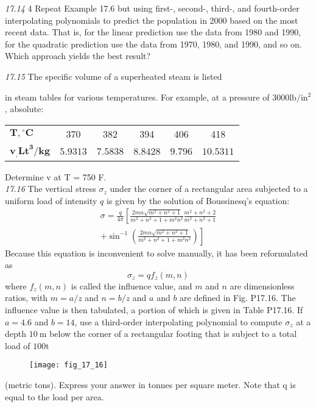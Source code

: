 \documentclass[../main.tex]{subfiles}
\begin{document}
\begin{multicols}{2}
\noindent\textit{17.14} 4 Repeat Example 17.6 but using first-, second-, third-,
and fourth-order interpolating polynomials to predict the
population in 2000 based on the most recent data. That is, for
the linear prediction use the data from 1980 and 1990, for the
quadratic prediction use the data from 1970, 1980, and 1990,
and so on. Which approach yields the best result?

\noindent\textit{17.15} The specific volume of a superheated steam is listed

in steam tables for various temperatures. For example, at a pressure of $3000 \mathrm{lb} / \mathrm{in}^{2}$, absolute:
\begin{tabular}{lccccc}
\hline $\boldsymbol{T},{ }^{\circ} \mathbf{C}$ & 370 & 382 & 394 & 406 & 418 \\
$\boldsymbol{v}_{\boldsymbol{,}} \mathbf{L t}^{\mathbf{3}} / \mathbf{k g}$ & $5.9313$ & $7.5838$ & $8.8428$ & $9.796$ & $10.5311$ \\
\hline
\end{tabular}
Determine v at T = 750 F.\\
\noindent\textit{17.16} The vertical stress $\sigma_{z}$ under the corner of a rectangular area subjected to a uniform load of intensity $q$ is given by the solution of Boussinesq's equation:
$$
\begin{array}{r}
\sigma=\frac{q}{4 \pi}\left[\frac{2 m n \sqrt{m^{2}+n^{2}+1}}{m^{2}+n^{2}+1+m^{2} n^{2}} \frac{m^{2}+n^{2}+2}{m^{2}+n^{2}+1}\right. \\
\left.+\sin ^{-1}\left(\frac{2 m n \sqrt{m^{2}+n^{2}+1}}{m^{2}+n^{2}+1+m^{2} n^{2}}\right)\right]
\end{array}
$$
Because this equation is inconvenient to solve manually, it has been reformulated as
$$
\sigma_{z}=q f_{z}(m, n)
$$
where $f_{z}(m, n)$ is called the influence value, and $m$ and $n$ are dimensionless ratios, with $m=a / z$ and $n=b / z$ and $a$ and $b$ are defined in Fig. P17.16. The influence value is then tabulated, a portion of which is given in Table P17.16. If $a=4.6$ and $b=14$, use a third-order interpolating polynomial to compute $\sigma_{z}$ at a depth $10 \mathrm{~m}$ below the corner of a rectangular footing that is subject to a total load of $100 \mathrm{t}$
\begin{figure}[H]
    \centering
    \texttt{[image: fig\_17\_16]}
   \caption{\textsf{}}\label{fig:fig_17_16}
\end{figure}
(metric tons). Express your answer in tonnes per square
meter. Note that q is equal to the load per area.


\end{multicols}
\end{document}

